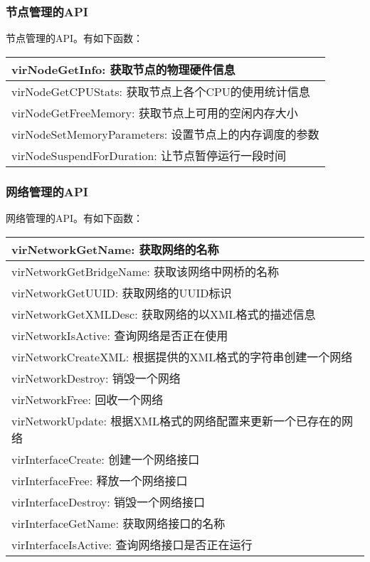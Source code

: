 \documentclass[a4paper,left=2.5cm,right=2.5cm,11pt]{article}
\begin{document}
\subsubsection{节点管理的API}
		节点管理的API。有如下函数：
		\begin{longtable}{p{13cm}}
		\hline
		virNodeGetInfo: 获取节点的物理硬件信息 \\
		\hline
		virNodeGetCPUStats: 获取节点上各个CPU的使用统计信息 \\
		\hline
		virNodeGetFreeMemory: 获取节点上可用的空闲内存大小 \\
		\hline
		virNodeSetMemoryParameters: 设置节点上的内存调度的参数 \\
		\hline
		virNodeSuspendForDuration: 让节点暂停运行一段时间 \\
		\hline
		\end{longtable}

\subsubsection{网络管理的API}
		网络管理的API。有如下函数：
		\begin{longtable}{p{13cm}}
		\hline
		virNetworkGetName: 获取网络的名称 \\
		\hline
		virNetworkGetBridgeName: 获取该网络中网桥的名称 \\
		\hline
		virNetworkGetUUID: 获取网络的UUID标识 \\
		\hline
		virNetworkGetXMLDesc: 获取网络的以XML格式的描述信息 \\
		\hline
		virNetworkIsActive: 查询网络是否正在使用 \\
		\hline
		virNetworkCreateXML: 根据提供的XML格式的字符串创建一个网络 \\
		\hline
		virNetworkDestroy: 销毁一个网络 \\
		\hline
		virNetworkFree: 回收一个网络 \\
		\hline
		virNetworkUpdate: 根据XML格式的网络配置来更新一个已存在的网络 \\
		\hline
		virInterfaceCreate: 创建一个网络接口 \\
		\hline
		virInterfaceFree: 释放一个网络接口 \\
		\hline
		virInterfaceDestroy: 销毁一个网络接口 \\
		\hline
		virInterfaceGetName: 获取网络接口的名称 \\
		\hline
		virInterfaceIsActive: 查询网络接口是否正在运行 \\
		\hline
		\end{longtable}
\end{document}
